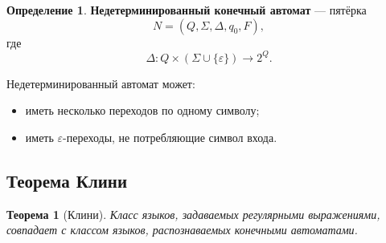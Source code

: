 \documentclass[12pt,a4paper]{article}
\theoremstyle{definition}
\newtheorem{definition}{Определение}
\theoremstyle{plain}
\newtheorem{theorem}{Теорема}
\begin{document}
\begin{definition}
\textbf{Недетерминированный конечный автомат} --- пятёрка
\[
N=(Q,\Sigma,\Delta,q_0,F),
\]
где
\[
\Delta: Q\times(\Sigma\cup\{\varepsilon\})\to 2^Q.
\]
\end{definition}

Недетерминированный автомат может:
\begin{itemize}
    \item иметь несколько переходов по одному символу;
    \item иметь $\varepsilon$-переходы, не потребляющие символ входа.
\end{itemize}

\subsection{Теорема Клини}

\begin{theorem}[Клини]
Класс языков, задаваемых регулярными выражениями, совпадает с классом языков, распознаваемых конечными автоматами.
\end{theorem}
\end{document}
